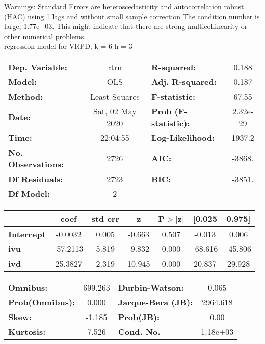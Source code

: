 Warnings: \newline
 [1] Standard Errors are heteroscedasticity and autocorrelation robust (HAC) using 1 lags and without small sample correction \newline
 [2] The condition number is large, 1.77e+03. This might indicate that there are \newline
 strong multicollinearity or other numerical problems.\\ 

regression model for VRPD, k = 6 h = 3\begin{center}
\begin{tabular}{lclc}
\toprule
\textbf{Dep. Variable:}    &       rtrn       & \textbf{  R-squared:         } &     0.188   \\
\textbf{Model:}            &       OLS        & \textbf{  Adj. R-squared:    } &     0.187   \\
\textbf{Method:}           &  Least Squares   & \textbf{  F-statistic:       } &     67.55   \\
\textbf{Date:}             & Sat, 02 May 2020 & \textbf{  Prob (F-statistic):} &  2.32e-29   \\
\textbf{Time:}             &     22:04:55     & \textbf{  Log-Likelihood:    } &    1937.2   \\
\textbf{No. Observations:} &        2726      & \textbf{  AIC:               } &    -3868.   \\
\textbf{Df Residuals:}     &        2723      & \textbf{  BIC:               } &    -3851.   \\
\textbf{Df Model:}         &           2      & \textbf{                     } &             \\
\bottomrule
\end{tabular}
\begin{tabular}{lcccccc}
                   & \textbf{coef} & \textbf{std err} & \textbf{z} & \textbf{P$> |$z$|$} & \textbf{[0.025} & \textbf{0.975]}  \\
\midrule
\textbf{Intercept} &      -0.0032  &        0.005     &    -0.663  &         0.507        &       -0.013    &        0.006     \\
\textbf{ivu}       &     -57.2113  &        5.819     &    -9.832  &         0.000        &      -68.616    &      -45.806     \\
\textbf{ivd}       &      25.3827  &        2.319     &    10.945  &         0.000        &       20.837    &       29.928     \\
\bottomrule
\end{tabular}
\begin{tabular}{lclc}
\textbf{Omnibus:}       & 699.263 & \textbf{  Durbin-Watson:     } &    0.065  \\
\textbf{Prob(Omnibus):} &   0.000 & \textbf{  Jarque-Bera (JB):  } & 2964.618  \\
\textbf{Skew:}          &  -1.185 & \textbf{  Prob(JB):          } &     0.00  \\
\textbf{Kurtosis:}      &   7.526 & \textbf{  Cond. No.          } & 1.18e+03  \\
\bottomrule
\end{tabular}
\end{center}

